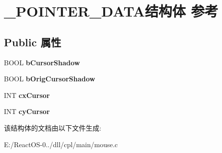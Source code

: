 \hypertarget{struct___p_o_i_n_t_e_r___d_a_t_a}{}\section{\+\_\+\+P\+O\+I\+N\+T\+E\+R\+\_\+\+D\+A\+T\+A结构体 参考}
\label{struct___p_o_i_n_t_e_r___d_a_t_a}
\subsection*{Public 属性}
\begin{DoxyCompactItemize}
\item 
\mbox{\label{struct___p_o_i_n_t_e_r___d_a_t_a_a83a972f0badb188862f2400e39e75f7d}} 
B\+O\+OL {\bfseries b\+Cursor\+Shadow}
\item 
\mbox{\label{struct___p_o_i_n_t_e_r___d_a_t_a_ac9713471c1759aaef22f77c705240680}} 
B\+O\+OL {\bfseries b\+Orig\+Cursor\+Shadow}
\item 
\mbox{\label{struct___p_o_i_n_t_e_r___d_a_t_a_aa68bc1b5257cd9363d9c0d9ac993a265}} 
I\+NT {\bfseries cx\+Cursor}
\item 
\mbox{\label{struct___p_o_i_n_t_e_r___d_a_t_a_acdd771ea7637d8215f3dc18da2adc29e}} 
I\+NT {\bfseries cy\+Cursor}
\end{DoxyCompactItemize}


该结构体的文档由以下文件生成\+:\begin{DoxyCompactItemize}
\item 
E\+:/\+React\+O\+S-\/0../dll/cpl/main/mouse.\+c\end{DoxyCompactItemize}
